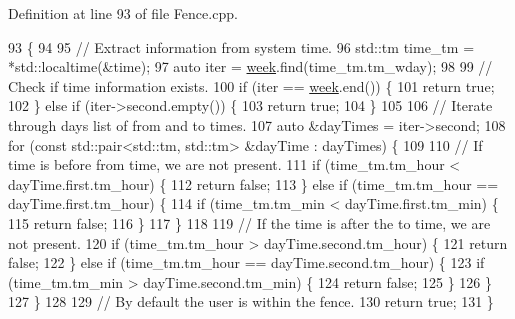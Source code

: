 Definition at line 93 of file Fence.\+cpp.


\begin{DoxyCode}
93                                           \{
94 
95     \textcolor{comment}{// Extract information from system time.}
96     std::tm time\_tm = *std::localtime(&time);
97     \textcolor{keyword}{auto} iter = \hyperlink{class_fence_ae589e973fa03316847aeceedd72e2b64}{week}.find(time\_tm.tm\_wday);
98 
99     \textcolor{comment}{// Check if time information exists.}
100     \textcolor{keywordflow}{if} (iter == \hyperlink{class_fence_ae589e973fa03316847aeceedd72e2b64}{week}.end()) \{
101         \textcolor{keywordflow}{return} \textcolor{keyword}{true};
102     \} \textcolor{keywordflow}{else} \textcolor{keywordflow}{if} (iter->second.empty()) \{
103         \textcolor{keywordflow}{return} \textcolor{keyword}{true};
104     \}
105 
106     \textcolor{comment}{// Iterate through days list of from and to times.}
107     \textcolor{keyword}{auto} &dayTimes = iter->second;
108     \textcolor{keywordflow}{for} (\textcolor{keyword}{const} std::pair<std::tm, std::tm> &dayTime : dayTimes) \{
109 
110         \textcolor{comment}{// If time is before from time, we are not present.}
111         \textcolor{keywordflow}{if} (time\_tm.tm\_hour < dayTime.first.tm\_hour) \{
112             \textcolor{keywordflow}{return} \textcolor{keyword}{false};
113         \} \textcolor{keywordflow}{else} \textcolor{keywordflow}{if} (time\_tm.tm\_hour == dayTime.first.tm\_hour) \{
114             \textcolor{keywordflow}{if} (time\_tm.tm\_min < dayTime.first.tm\_min) \{
115                 \textcolor{keywordflow}{return} \textcolor{keyword}{false};
116             \}
117         \}
118 
119         \textcolor{comment}{// If the time is after the to time, we are not present.}
120         \textcolor{keywordflow}{if} (time\_tm.tm\_hour > dayTime.second.tm\_hour) \{
121             \textcolor{keywordflow}{return} \textcolor{keyword}{false};
122         \} \textcolor{keywordflow}{else} \textcolor{keywordflow}{if} (time\_tm.tm\_hour == dayTime.second.tm\_hour) \{
123             \textcolor{keywordflow}{if} (time\_tm.tm\_min > dayTime.second.tm\_min) \{
124                 \textcolor{keywordflow}{return} \textcolor{keyword}{false};
125             \}
126         \}
127     \}
128 
129     \textcolor{comment}{// By default the user is within the fence.}
130     \textcolor{keywordflow}{return} \textcolor{keyword}{true};
131 \}
\end{DoxyCode}
\mbox{\label{class_fence_a4f0626e3b3189b6ab1c505c92952bcb2}} 
